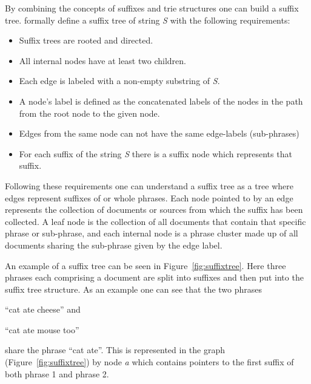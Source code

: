 By combining the concepts of suffixes and trie structures one can build a suffix tree. \cite{Oren1998} formally define a suffix tree of string \textit{S} with the following requirements:
\begin{itemize}
\item Suffix trees are rooted and directed.
\item All internal nodes have at least two children.
\item Each edge is labeled with a non-empty substring of \textit{S}.
\item A node's label is defined as the concatenated labels of the nodes in the path from the root node to the given node.
\item Edges from the same node can not have the same edge-labels (sub-phrases)
\item For each suffix of the string \textit{S} there is a suffix node which represents that suffix.
\end{itemize}

Following these requirements one can understand a suffix tree as a tree where edges represent suffixes of or whole phrases. Each node pointed to by an edge represents the collection of documents or sources from which the suffix has been collected. A leaf node is the collection of all documents that contain that specific phrase or sub-phrase, and each internal node is a phrase cluster made up of all documents sharing the sub-phrase given by the edge label.

An example of a suffix tree can be seen in Figure~\ref{fig:suffixtree}. Here three phrases each comprising a document are split into suffixes and then put into the suffix tree structure. As an example one can see that the two phrases
\begin{inparaenum}[\itshape 1\upshape)]
\item ``cat ate cheese'' and
\item ``cat ate mouse too''
\end{inparaenum}
share the phrase ``cat ate''. This is represented in the graph (Figure~\ref{fig:suffixtree}) by node \textit{a} which contains pointers to the first suffix of both phrase 1 and phrase 2.

